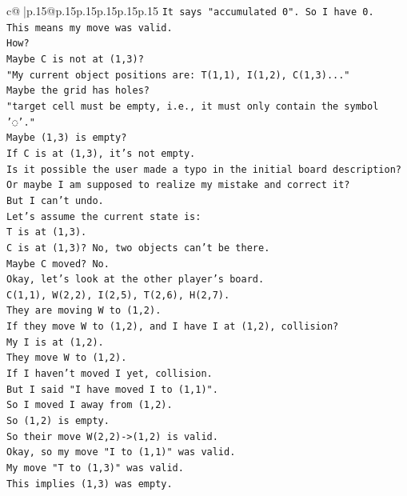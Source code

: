 \documentclass{article}
\begin{document}
{\begin{supertabular}{c@{$\;$}|p{.15\linewidth}@{}p{.15\linewidth}p{.15\linewidth}p{.15\linewidth}p{.15\linewidth}p{.15\linewidth}}
{{{\texttt{It says "accumulated 0". So I have 0.} \\
\texttt{This means my move was valid.} \\
\texttt{How?} \\
\texttt{Maybe C is not at (1,3)?} \\
\texttt{"My current object positions are: T(1,1), I(1,2), C(1,3)..."} \\
\texttt{Maybe the grid has holes?} \\
\texttt{"target cell must be empty, i.e., it must only contain the symbol '◌'."} \\
\texttt{Maybe (1,3) is empty?} \\
\texttt{If C is at (1,3), it's not empty.} \\
\texttt{Is it possible the user made a typo in the initial board description?} \\
\texttt{Or maybe I am supposed to realize my mistake and correct it?} \\
\texttt{But I can't undo.} \\
\texttt{Let's assume the current state is:} \\
\texttt{T is at (1,3).} \\
\texttt{C is at (1,3)? No, two objects can't be there.} \\
\texttt{Maybe C moved? No.} \\
\texttt{Okay, let's look at the other player's board.} \\
\texttt{C(1,1), W(2,2), I(2,5), T(2,6), H(2,7).} \\
\texttt{They are moving W to (1,2).} \\
\texttt{If they move W to (1,2), and I have I at (1,2), collision?} \\
\texttt{My I is at (1,2).} \\
\texttt{They move W to (1,2).} \\
\texttt{If I haven't moved I yet, collision.} \\
\texttt{But I said "I have moved I to (1,1)".} \\
\texttt{So I moved I away from (1,2).} \\
\texttt{So (1,2) is empty.} \\
\texttt{So their move W(2,2){-}>(1,2) is valid.} \\
\texttt{Okay, so my move "I to (1,1)" was valid.} \\
\texttt{My move "T to (1,3)" was valid.} \\
\texttt{This implies (1,3) was empty.} \\
}}}
\end{supertabular}}
\end{document}
